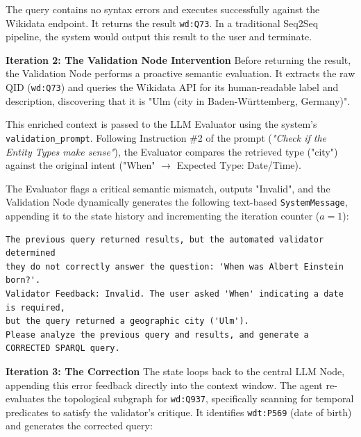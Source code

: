 The query contains no syntax errors and executes successfully against the Wikidata endpoint. It returns the result \texttt{wd:Q73}. In a traditional Seq2Seq pipeline, the system would output this result to the user and terminate. 

\textbf{Iteration 2: The Validation Node Intervention}
Before returning the result, the Validation Node performs a proactive semantic evaluation. It extracts the raw QID (\texttt{wd:Q73}) and queries the Wikidata API for its human-readable label and description, discovering that it is "Ulm (city in Baden-Württemberg, Germany)". 

This enriched context is passed to the LLM Evaluator using the system's \texttt{validation\_prompt}. Following Instruction \#2 of the prompt (\textit{"Check if the Entity Types make sense"}), the Evaluator compares the retrieved type ("city") against the original intent ("When" $\rightarrow$ Expected Type: Date/Time). 

The Evaluator flags a critical semantic mismatch, outputs "Invalid", and the Validation Node dynamically generates the following text-based \texttt{SystemMessage}, appending it to the state history and incrementing the iteration counter ($a=1$):

\noindent
\begin{minipage}{\textwidth}
\begin{lstlisting}[basicstyle=\ttfamily\footnotesize, frame=single, caption={Actual SystemMessage injected into the LangGraph state by the Validation Node, forcing the LLM to correct the semantic mismatch.}, label={lst:validation_feedback}]
The previous query returned results, but the automated validator determined
they do not correctly answer the question: 'When was Albert Einstein born?'.
Validator Feedback: Invalid. The user asked 'When' indicating a date is required, 
but the query returned a geographic city ('Ulm').
Please analyze the previous query and results, and generate a 
CORRECTED SPARQL query.
\end{lstlisting}
\end{minipage}

\textbf{Iteration 3: The Correction}
The state loops back to the central LLM Node, appending this error feedback directly into the context window. The agent re-evaluates the topological subgraph for \texttt{wd:Q937}, specifically scanning for temporal predicates to satisfy the validator's critique. It identifies \texttt{wdt:P569} (date of birth) and generates the corrected query:

